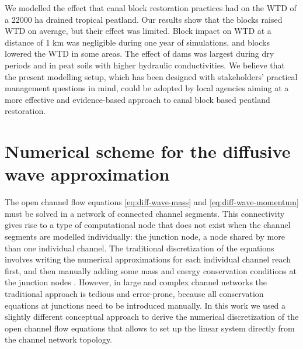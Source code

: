 \documentclass[bg, manuscript]{copernicus}
\begin{document}
\conclusions  %
We modelled the effect that canal block restoration practices had on the WTD of a 22000 \unit{ha} drained tropical peatland.
Our results show that the blocks raised WTD on average, but their effect was limited.
Block impact on WTD at a distance of 1 \unit{km} was negligible during one year of simulations, and blocks lowered the WTD in some  areas.
The effect of dams was largest during dry periods and in peat soils with higher hydraulic conductivities.
We believe that the present modelling setup, which has been designed with stakeholders' practical management questions in mind, could be adopted by local agencies aiming at a more effective and evidence-based approach to canal block based peatland restoration.











\appendix
\section{Numerical scheme for the diffusive wave approximation} \label{ap-difwave}

The open channel flow equations \eqref{eq:diff-wave-mass} and \eqref{eq:diff-wave-momentum} must be solved in a  network of connected channel segments.
This connectivity gives rise to a  type of computational node that does not exist when the channel segments are modelled individually: the junction node, a node shared by more than one individual channel. 
The traditional discretization of the equations  involves writing the numerical approximations for each individual channel reach first, and then manually adding some mass and energy conservation conditions at the junction nodes \citep{cungePracticalAspectsComputational1980, szymkiewiczNumericalModelingOpen2010}.
However, in large and complex channel networks the traditional approach is tedious and error-prone, because all conservation equations at junctions need to   be introduced manually.
In this work we used a slightly different conceptual approach to derive the numerical discretization of the open channel flow equations that allows to set up the linear system directly from the channel network topology.
\end{document}
